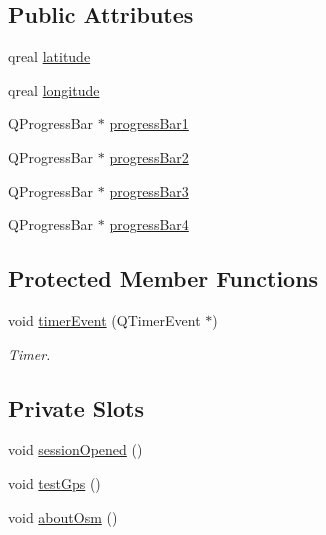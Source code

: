 \subsection*{Public Attributes}
\begin{DoxyCompactItemize}
\item 
qreal \hyperlink{classMainWindow_a8eb6f9adebecfb3cf78c566686f1f35e}{latitude}
\item 
qreal \hyperlink{classMainWindow_ac7c0f22da72ad33678ff3d3e22c722c7}{longitude}
\item 
Q\-Progress\-Bar $\ast$ \hyperlink{classMainWindow_a50d8f5aa716821eca4ad0a3bfb0cf2ec}{progress\-Bar1}
\item 
Q\-Progress\-Bar $\ast$ \hyperlink{classMainWindow_a0594f2275ce1af436549e95cf62cfe7d}{progress\-Bar2}
\item 
Q\-Progress\-Bar $\ast$ \hyperlink{classMainWindow_a4afea90f9ba8cd1d26fa3b552639a012}{progress\-Bar3}
\item 
Q\-Progress\-Bar $\ast$ \hyperlink{classMainWindow_a8672c729ad5494d2890676bf07518ea2}{progress\-Bar4}
\end{DoxyCompactItemize}
\subsection*{Protected Member Functions}
\begin{DoxyCompactItemize}
\item 
void \hyperlink{classMainWindow_a1c7877c1ca466bd8034d88762ce2af9f}{timer\-Event} (Q\-Timer\-Event $\ast$)
\begin{DoxyCompactList}\small\item\em Timer. \end{DoxyCompactList}\end{DoxyCompactItemize}
\subsection*{Private Slots}
\begin{DoxyCompactItemize}
\item 
void \hyperlink{classMainWindow_ab218243366728139f7af5b3d6d97e8af}{session\-Opened} ()
\item 
void \hyperlink{classMainWindow_a99e264f214b0841cb0f990ae7b103289}{test\-Gps} ()
\item 
void \hyperlink{classMainWindow_af8ce1443f9a63d9edb6207f6361c0b9c}{about\-Osm} ()
\end{DoxyCompactItemize}
